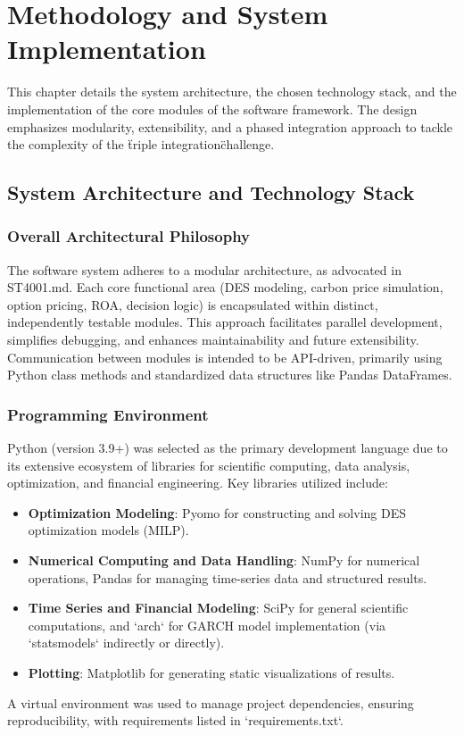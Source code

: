 \chapter{Methodology and System Implementation}
\label{chap:methods}

This chapter details the system architecture, the chosen technology stack, and the implementation of the core modules of the software framework. The design emphasizes modularity, extensibility, and a phased integration approach to tackle the complexity of the \"triple integration\" challenge.

\section{System Architecture and Technology Stack}

\subsection{Overall Architectural Philosophy}
The software system adheres to a modular architecture, as advocated in ST4001.md. Each core functional area (DES modeling, carbon price simulation, option pricing, ROA, decision logic) is encapsulated within distinct, independently testable modules. This approach facilitates parallel development, simplifies debugging, and enhances maintainability and future extensibility. Communication between modules is intended to be API-driven, primarily using Python class methods and standardized data structures like Pandas DataFrames.

\subsection{Programming Environment}
Python (version 3.9+) was selected as the primary development language due to its extensive ecosystem of libraries for scientific computing, data analysis, optimization, and financial engineering. Key libraries utilized include:
\begin{itemize}
    \item \textbf{Optimization Modeling}: Pyomo for constructing and solving DES optimization models (MILP).
    \item \textbf{Numerical Computing and Data Handling}: NumPy for numerical operations, Pandas for managing time-series data and structured results.
    \item \textbf{Time Series and Financial Modeling}: SciPy for general scientific computations, and `arch` for GARCH model implementation (via `statsmodels` indirectly or directly).
    \item \textbf{Plotting}: Matplotlib for generating static visualizations of results.
\end{itemize}
A virtual environment was used to manage project dependencies, ensuring reproducibility, with requirements listed in `requirements.txt`.

